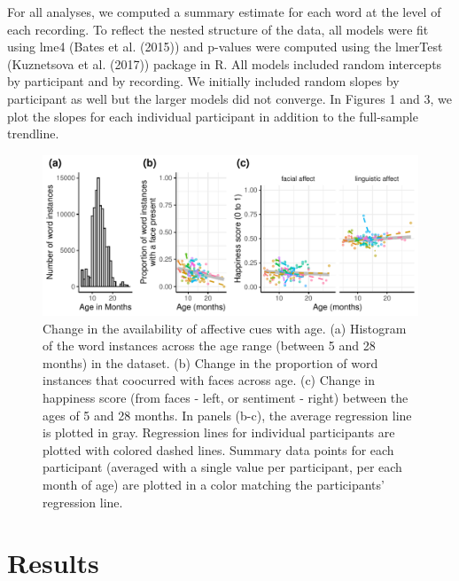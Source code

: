 \documentclass[10pt, letterpaper]{article}
\begin{document}
For all analyses, we computed a summary estimate for each word at the
level of each recording. To reflect the nested structure of the data,
all models were fit using lme4 (Bates et al. (2015)) and p-values were
computed using the lmerTest (Kuznetsova et al. (2017)) package in R. All
models included random intercepts by participant and by recording. We
initially included random slopes by participant as well but the larger
models did not converge. In Figures 1 and 3, we plot the slopes for each
individual participant in addition to the full-sample trendline.

\begin{CodeChunk}
\begin{figure}[h]

{\centering \includegraphics{figs/figure1-1} 

}

\caption[Change in the availability of affective cues with age]{Change in the availability of affective cues with age. (a) Histogram of the word instances across the age range (between 5 and 28 months) in the dataset. (b) Change in the proportion of word instances that coocurred with faces across age. (c) Change in happiness score (from faces - left, or sentiment - right) between the ages of 5 and 28 months. In panels (b-c), the average regression line is plotted in gray. Regression lines for individual participants are plotted with colored dashed lines. Summary data points for each participant (averaged with a single value per participant, per each month of age) are plotted in a color matching the participants’ regression line.}\label{fig:figure1}
\end{figure}
\end{CodeChunk}

\section{Results}\label{results}
\end{document}
